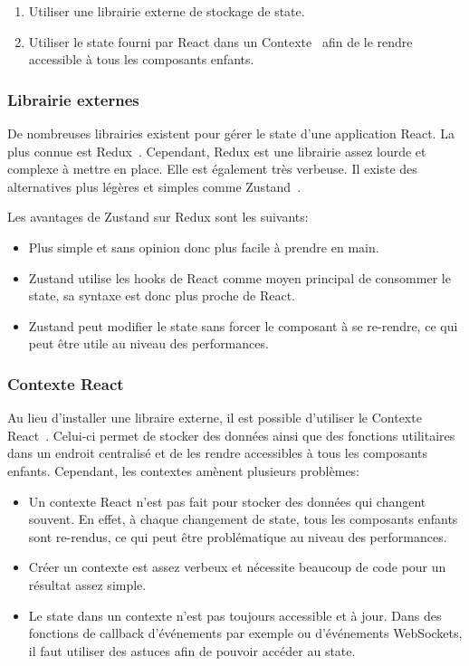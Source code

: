 \begin{enumerate}
  \item Utiliser une librairie externe de stockage de state.
  \item Utiliser le state fourni par React dans un Contexte~\cite{react-context} afin de le rendre accessible à tous les composants enfants.
\end{enumerate}

\subsubsection{Librairie externes}

De nombreuses librairies existent pour gérer le state d'une application React. La plus connue est Redux~\cite{react-redux}. Cependant, Redux est une librairie assez lourde et complexe à mettre en place. Elle est également très verbeuse. Il existe des alternatives plus légères et simples comme Zustand~\cite{zustand}.

Les avantages de Zustand sur Redux sont les suivants:
\begin{itemize}
  \item Plus simple et sans opinion donc plus facile à prendre en main.
  \item Zustand utilise les hooks de React comme moyen principal de consommer le state, sa syntaxe est donc plus proche de React.
  \item Zustand peut modifier le state sans forcer le composant à se re-rendre, ce qui peut être utile au niveau des performances.
\end{itemize}

\subsubsection{Contexte React}

Au lieu d'installer une libraire externe, il est possible d'utiliser le Contexte React~\cite{react-context}. Celui-ci permet de stocker des données ainsi que des fonctions utilitaires dans un endroit centralisé et de les rendre accessibles à tous les composants enfants. Cependant, les contextes amènent plusieurs problèmes:

\begin{itemize}
  \item Un contexte React n'est pas fait pour stocker des données qui changent souvent. En effet, à chaque changement de state, tous les composants enfants sont re-rendus, ce qui peut être problématique au niveau des performances.
  \item Créer un contexte est assez verbeux et nécessite beaucoup de code pour un résultat assez simple.
  \item Le state dans un contexte n'est pas toujours accessible et à jour. Dans des fonctions de callback d'événements par exemple ou d'événements WebSockets, il faut utiliser des astuces afin de pouvoir accéder au state.
\end{itemize}

